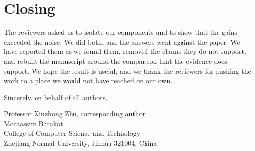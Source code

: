 \documentclass[11pt, a4paper]{article}
\begin{document}
\section*{Closing}

The reviewers asked us to isolate our components and to show that the gains
exceeded the noise. We did both, and the answers went against the paper. We have
reported them as we found them, removed the claims they do not support, and
rebuilt the manuscript around the comparison that the evidence does support. We
hope the result is useful, and we thank the reviewers for pushing the work to a
place we would not have reached on our own.

\bigskip

Sincerely, on behalf of all authors,

\bigskip\bigskip

Professor Xinzhong Zhu, corresponding author \\
Moatassim Barakat \\
College of Computer Science and Technology \\
Zhejiang Normal University, Jinhua 321004, China
\end{document}
